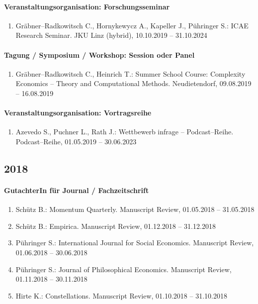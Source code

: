 \paragraph{Veranstaltungsorganisation: Forschungsseminar}
\begin{enumerate}[leftmargin=*, labelsep=0.5cm]
\item Gräbner--Radkowitsch C., Hornykewycz A., Kapeller J., Pühringer S.: ICAE Research Seminar. JKU Linz (hybrid), 10.10.2019 -- 31.10.2024
\end{enumerate}
\paragraph{Tagung / Symposium / Workshop: Session oder Panel}
\begin{enumerate}[leftmargin=*, labelsep=0.5cm]
\item Gräbner--Radkowitsch C., Heinrich T.: Summer School Course: Complexity Economics -- Theory and Computational Methods. Neudietendorf, 09.08.2019 -- 16.08.2019
\end{enumerate}
\paragraph{Veranstaltungsorganisation: Vortragsreihe}
\begin{enumerate}[leftmargin=*, labelsep=0.5cm]
\item Azevedo S., Puchner L., Rath J.: Wettbewerb infrage -- Podcast--Reihe. Podcast--Reihe, 01.05.2019 -- 30.06.2023
\end{enumerate}\subsection*{2018}\paragraph{GutachterIn für Journal / Fachzeitschrift}
\begin{enumerate}[leftmargin=*, labelsep=0.5cm]
\item Schütz B.: Momentum Quarterly. Manuscript Review, 01.05.2018 -- 31.05.2018
\item Schütz B.: Empirica. Manuscript Review, 01.12.2018 -- 31.12.2018
\item Pühringer S.: International Journal for Social Economics. Manuscript Review, 01.06.2018 -- 30.06.2018
\item Pühringer S.: Journal of Philosophical Economics. Manuscript Review, 01.11.2018 -- 30.11.2018
\item Hirte K.: Constellations. Manuscript Review, 01.10.2018 -- 31.10.2018
\end{enumerate}
